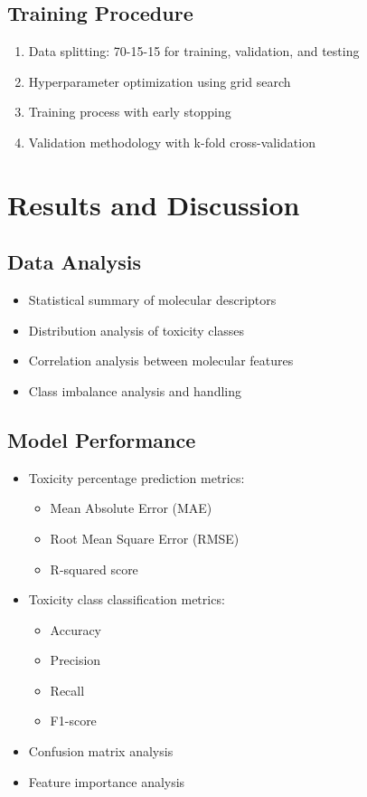 \documentclass[conference]{IEEEtran}
\begin{document}
\subsection{Training Procedure}
\begin{enumerate}
    \item Data splitting: 70-15-15 for training, validation, and testing
    \item Hyperparameter optimization using grid search
    \item Training process with early stopping
    \item Validation methodology with k-fold cross-validation
\end{enumerate}

\section{Results and Discussion}

\subsection{Data Analysis}
\begin{itemize}
    \item Statistical summary of molecular descriptors
    \item Distribution analysis of toxicity classes
    \item Correlation analysis between molecular features
    \item Class imbalance analysis and handling
\end{itemize}

\subsection{Model Performance}
\begin{itemize}
    \item Toxicity percentage prediction metrics:
        \begin{itemize}
            \item Mean Absolute Error (MAE)
            \item Root Mean Square Error (RMSE)
            \item R-squared score
        \end{itemize}
    \item Toxicity class classification metrics:
        \begin{itemize}
            \item Accuracy
            \item Precision
            \item Recall
            \item F1-score
        \end{itemize}
    \item Confusion matrix analysis
    \item Feature importance analysis
\end{itemize}
\end{document}
